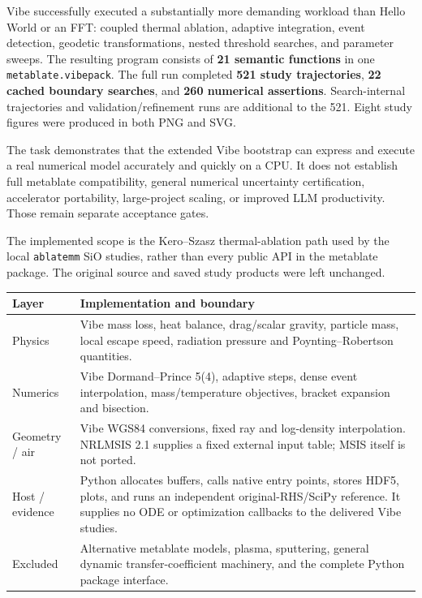 \documentclass[10pt]{article}
\begin{document}
\makemmmemo


Vibe successfully executed a substantially more demanding workload than Hello
World or an FFT: coupled thermal ablation, adaptive integration, event detection,
geodetic transformations, nested threshold searches, and parameter sweeps.
The resulting program consists of \textbf{21 semantic functions} in one
\texttt{metablate.vibepack}. The full run completed \textbf{521 study trajectories},
\textbf{22 cached boundary searches}, and \textbf{260 numerical assertions}.
Search-internal trajectories and validation/refinement runs are additional to
the 521. Eight study figures were produced in both PNG and SVG.

\begin{mmconclusion}
The task demonstrates that the extended Vibe bootstrap can express and execute
a real numerical model accurately and quickly on a CPU. It does not establish
full metablate compatibility, general numerical uncertainty certification,
accelerator portability, large-project scaling, or improved LLM productivity.
Those remain separate acceptance gates.
\end{mmconclusion}


The implemented scope is the Kero--Szasz thermal-ablation path used by the local
\texttt{ablatemm} SiO studies, rather than every public API in the metablate
package. The original source and saved study products were left unchanged.

\begin{center}
\begin{tabular}{@{}p{1.30in}p{5.53in}@{}}
\toprule
Layer & Implementation and boundary \\
\midrule
Physics & Vibe mass loss, heat balance, drag/scalar gravity, particle mass,
local escape speed, radiation pressure and Poynting--Robertson quantities. \\
Numerics & Vibe Dormand--Prince 5(4), adaptive steps, dense event interpolation,
mass/temperature objectives, bracket expansion and bisection. \\
Geometry / air & Vibe WGS84 conversions, fixed ray and log-density interpolation.
NRLMSIS 2.1 supplies a fixed external input table; MSIS itself is not ported. \\
Host / evidence & Python allocates buffers, calls native entry points, stores
HDF5, plots, and runs an independent original-RHS/SciPy reference. It supplies
no ODE or optimization callbacks to the delivered Vibe studies. \\
Excluded & Alternative metablate models, plasma, sputtering, general dynamic
transfer-coefficient machinery, and the complete Python package interface. \\
\bottomrule
\end{tabular}
\end{center}
\end{document}
